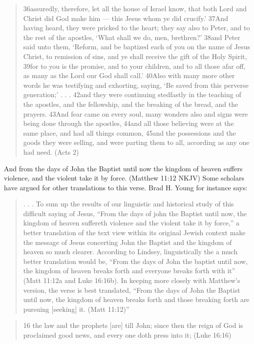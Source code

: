 \documentclass[11pt]{article}
\begin{document}
\begin{quote}
36assuredly, therefore, let all the house of Israel know, that both Lord and Christ did God make him — this Jesus whom ye did crucify.’ 37And having heard, they were pricked to the heart; they say also to Peter, and to the rest of the apostles, ‘What shall we do, men, brethren?’ 38and Peter said unto them, ‘Reform, and be baptized each of you on the name of Jesus Christ, to remission of sins, and ye shall receive the gift of the Holy Spirit, 39for to you is the promise, and to your children, and to all those afar off, as many as the Lord our God shall call.’ 40Also with many more other words he was testifying and exhorting, saying, ‘Be saved from this perverse generation;’
. . .
42and they were continuing stedfastly in the teaching of the apostles, and the fellowship, and the breaking of the bread, and the prayers.
43And fear came on every soul, many wonders also and signs were being done through the apostles, 44and all those believing were at the same place, and had all things common, 45and the possessions and the goods they were selling, and were parting them to all, according as any one had need. (Acts 2)
\end{quote}
And from the days of John the Baptist until now the
kingdom of heaven suffers violence, and the violent take it by force.
(Matthew 11:12 NKJV)
Some scholars have argued for other translations to this verse. Brad
H. Young for instance says:
\begin{quote}
. . . To sum up the results of our linguistic and historical study of
this difficult saying of Jesus, “From the days of john the Baptist
until now, the kingdom of heaven suffereth violence and the violent
take it by force,” a better translation of the text view within its
original Jewish context make the message of Jesus concerting John the
Baptist and the kingdom of heaven so much clearer. According to
Lindsey, linguistically the a much better translation would be, “From
the days of John the baptist until now, the kingdom of heaven breaks
forth and everyone breaks forth with it” (Matt 11:12a and Luke
16:16b). In keeping more closely with Matthew’s version, the verse is
best translated, “From the days of John the Baptist until now, the
kingdom of heaven breaks forth and those breaking forth are pursuing [seeking] it. (Matt 11:12)”
\end{quote}
\begin{quote}
16 the law and the prophets [are] till John; since then the reign of God is proclaimed good news, and every one doth press into it; (Luke 16:16)
\end{quote}
\end{document}
